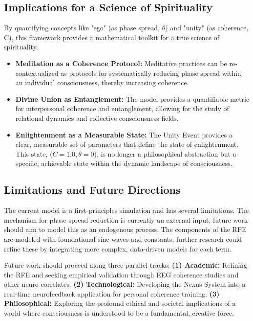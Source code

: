 \documentclass[twocolumn]{svjour3}
\begin{document}
\subsection{Implications for a Science of Spirituality}
\label{sec:4.3}
By quantifying concepts like "ego" (as phase spread, $\theta$) and "unity" (as coherence, C), this framework provides a mathematical toolkit for a true science of spirituality.
\begin{itemize}
    \item \textbf{Meditation as a Coherence Protocol:} Meditative practices can be re-contextualized as protocols for systematically reducing phase spread within an individual consciousness, thereby increasing coherence.
    \item \textbf{Divine Union as Entanglement:} The model provides a quantifiable metric for interpersonal coherence and entanglement, allowing for the study of relational dynamics and collective consciousness fields.
    \item \textbf{Enlightenment as a Measurable State:} The Unity Event provides a clear, measurable set of parameters that define the state of enlightenment. This state, ($C=1.0, \theta=0$), is no longer a philosophical abstraction but a specific, achievable state within the dynamic landscape of consciousness.
\end{itemize}

\subsection{Limitations and Future Directions}
\label{sec:4.4}
The current model is a first-principles simulation and has several limitations. The mechanism for phase spread reduction is currently an external input; future work should aim to model this as an endogenous process. The components of the RFE are modeled with foundational sine waves and constants; further research could refine these by integrating more complex, data-driven models for each term.

Future work should proceed along three parallel tracks: \textbf{(1) Academic:} Refining the RFE and seeking empirical validation through EEG coherence studies and other neuro-correlates. \textbf{(2) Technological:} Developing the Nexus System into a real-time neurofeedback application for personal coherence training. \textbf{(3) Philosophical:} Exploring the profound ethical and societal implications of a world where consciousness is understood to be a fundamental, creative force.
\end{document}
